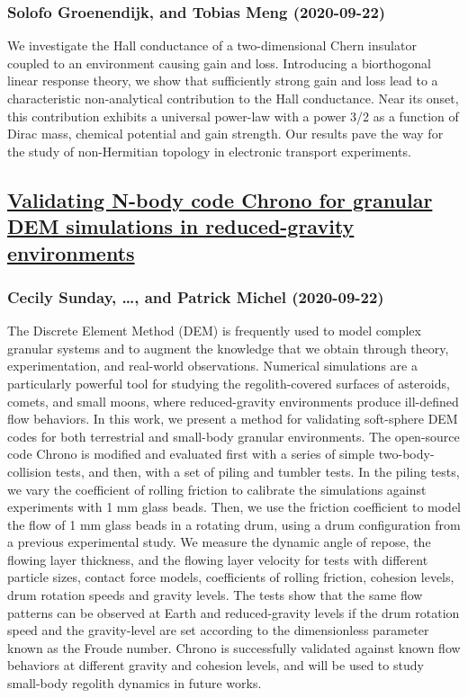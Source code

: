 {\subsubsection*{Solofo Groenendijk, and Tobias Meng (2020-09-22)}
We investigate the Hall conductance of a two-dimensional Chern insulator
coupled to an environment causing gain and loss. Introducing a biorthogonal
linear response theory, we show that sufficiently strong gain and loss lead to
a characteristic non-analytical contribution to the Hall conductance. Near its
onset, this contribution exhibits a universal power-law with a power 3/2 as a
function of Dirac mass, chemical potential and gain strength. Our results pave
the way for the study of non-Hermitian topology in electronic transport
experiments.

\subsection*{\href{http://arxiv.org/abs/2009.10448v1}{Validating N-body code Chrono for granular DEM simulations in  reduced-gravity environments}}
\subsubsection*{Cecily Sunday, \dots, and Patrick Michel (2020-09-22)}
The Discrete Element Method (DEM) is frequently used to model complex
granular systems and to augment the knowledge that we obtain through theory,
experimentation, and real-world observations. Numerical simulations are a
particularly powerful tool for studying the regolith-covered surfaces of
asteroids, comets, and small moons, where reduced-gravity environments produce
ill-defined flow behaviors. In this work, we present a method for validating
soft-sphere DEM codes for both terrestrial and small-body granular
environments. The open-source code Chrono is modified and evaluated first with
a series of simple two-body-collision tests, and then, with a set of piling and
tumbler tests. In the piling tests, we vary the coefficient of rolling friction
to calibrate the simulations against experiments with 1 mm glass beads. Then,
we use the friction coefficient to model the flow of 1 mm glass beads in a
rotating drum, using a drum configuration from a previous experimental study.
We measure the dynamic angle of repose, the flowing layer thickness, and the
flowing layer velocity for tests with different particle sizes, contact force
models, coefficients of rolling friction, cohesion levels, drum rotation speeds
and gravity levels. The tests show that the same flow patterns can be observed
at Earth and reduced-gravity levels if the drum rotation speed and the
gravity-level are set according to the dimensionless parameter known as the
Froude number. Chrono is successfully validated against known flow behaviors at
different gravity and cohesion levels, and will be used to study small-body
regolith dynamics in future works.

}
